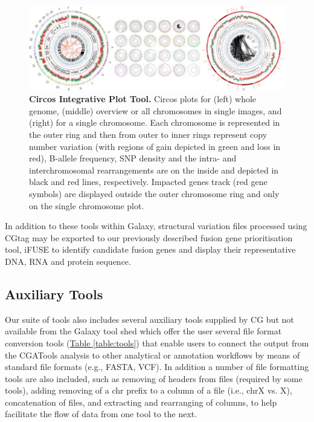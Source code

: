 \begin{figure}[t!]
\centering
\includegraphics[scale=2]{chapters/images/cgtag/fig2-circos.png}
\caption{\textbf{Circos Integrative Plot Tool.} Circos plots for (left) whole genome, (middle) overview or all chromosomes in single images, and (right) for a single chromosome.  Each chromosome is represented in the outer ring and then from outer to inner rings represent copy number variation (with regions of gain depicted in green and loss in red), B-allele frequency, SNP density and the intra- and interchromosomal rearrangements are on the inside and depicted in black and red lines, respectively.  Impacted genes track (red gene symbols) are displayed outside the outer chromosome ring and only on the single chromosome plot.}
\label{fig:circos}
\end{figure}


In addition to these tools within Galaxy, structural variation files processed using CGtag may be exported to our previously described fusion gene prioritisation tool, iFUSE \cite{url-ifuse} to identify candidate fusion genes and display their representative DNA, RNA and protein sequence.


\subsection*{Auxiliary Tools}

Our suite of tools also includes several auxiliary tools supplied by CG but not available from the Galaxy tool shed which offer the user several file format conversion tools (\hyperref[table:tools]{Table \ref{table:tools}}) that enable users to connect the output from the CGATools analysis to other analytical or annotation workflows by means of standard file formats (e.g., FASTA, VCF). In addition a number of file formatting tools are also included, such as removing of headers from files (required by some tools), adding removing of a chr prefix to a column of a file (i.e., chrX vs. X), concatenation of files, and extracting and rearranging of columns, to help facilitate the flow of data from one tool to the next.

